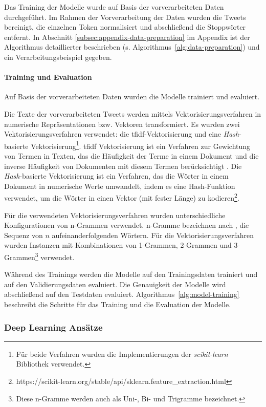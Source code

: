 Das Training der Modelle wurde auf Basis der vorverarbeiteten Daten durchgeführt.
Im Rahmen der Vorverarbeitung der Daten wurden die Tweets bereinigt, die einzelnen Token normalisiert und abschließend die Stoppwörter entfernt.
In Abschnitt \ref{subsec:appendix-data-preparation} im Appendix ist der Algorithmus detaillierter beschrieben (s. Algorithmus~\ref{alg:data-preparation}) und ein Verarbeitungsbeispiel gegeben.

\paragraph{Training und Evaluation}
Auf Basis der vorverarbeiteten Daten wurden die Modelle trainiert und evaluiert.

Die Texte der vorverarbeiteten Tweets werden mittels Vektorisierungsverfahren in numerische Repräsentationen bzw. Vektoren transformiert.
Es wurden zwei Vekto\-risierungs\-verfahren verwendet: die \gls{tfidf}-Vek\-to\-ri\-sie\-rung und eine \textit{Hash}-basierte Vektorisierung\footnote{Für beide Verfahren wurden die Implementierungen der \textit{scikit-learn} Bibliothek verwendet.}.
\gls{tfidf} Vektorisierung ist ein Verfahren zur Gewichtung von Termen in Texten, das die Häufigkeit der Terme in einem Dokument und die inverse Häufigkeit von Dokumenten mit diesem Termen berücksichtigt \cite[S. 119]{manning2009introduction}.
Die \textit{Hash}-basierte Vektorisierung ist ein Verfahren, das die Wörter in einem Dokument in numerische Werte umwandelt, indem es eine Hash-Funktion verwendet, um die Wörter in einen Vektor (mit fester Länge) zu kodieren\footnote{https://scikit-learn.org/stable/api/sklearn.feature\_extraction.html}.

Für die verwendeten Vektorisierungsverfahren wurden unterschiedliche Konfigurationen von n-Grammen verwendet.
n-Gramme bezeichnen nach \cite[S.33]{jm3}, die Sequenz von $n$ aufeinanderfolgenden Wörtern.
Für die Vektorisierungsverfahren wurden Instanzen mit Kombinationen von 1-Grammen, 2-Grammen und 3-Grammen\footnote{Diese n-Gramme werden auch als Uni-, Bi- und Trigramme bezeichnet.} verwendet.

Während des Trainings werden die Modelle auf den Trainingsdaten trainiert und auf den Validierungsdaten evaluiert.
Die Genauigkeit der Modelle wird abschließend auf den Testdaten evaluiert.
Algorithmus~\ref{alg:model-training} beschreibt die Schritte für das Training und die Evaluation der Modelle.

\subsubsection{Deep Learning Ansätze} \label{sec:deep-learning-ansaetze}

